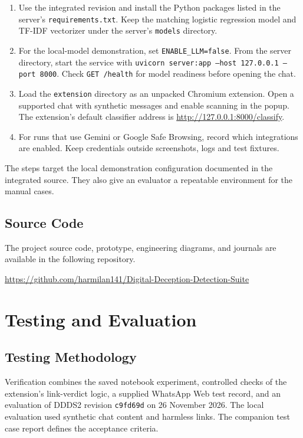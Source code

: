 \documentclass[12pt,letterpaper,twoside,openany]{book}
\newcommand{\DDDSRepo}{https://github.com/harmilan141/Digital-Deception-Detection-Suite}
\begin{document}
\begin{enumerate}
  \item Use the integrated revision and install the Python packages listed in the server's \texttt{requirements.txt}. Keep the matching logistic regression model and TF-IDF vectorizer under the server's \texttt{models} directory.
  \item For the local-model demonstration, set \texttt{ENABLE\_LLM=false}. From the server directory, start the service with \texttt{uvicorn server:app --host 127.0.0.1 --port 8000}. Check \texttt{GET /health} for model readiness before opening the chat.
  \item Load the \texttt{extension} directory as an unpacked Chromium extension. Open a supported chat with synthetic messages and enable scanning in the popup. The extension's default classifier address is \url{http://127.0.0.1:8000/classify}.
  \item For runs that use Gemini or Google Safe Browsing, record which integrations are enabled. Keep credentials outside screenshots, logs and test fixtures.
\end{enumerate}

The steps target the local demonstration configuration documented in the integrated source. They also give an evaluator a repeatable environment for the manual cases. \cite{integration}

\section{Source Code}

The project source code, prototype, engineering diagrams, and journals are available in the following repository.

\noindent\expandafter\url\expandafter{\DDDSRepo}

\chapter{Testing and Evaluation}
\label{chap:testing}

\section{Testing Methodology}

Verification combines the saved notebook experiment, controlled checks of the extension's link-verdict logic, a supplied WhatsApp Web test record, and an evaluation of DDDS2 revision \texttt{c9fd69d} on 26 November 2026. The local evaluation used synthetic chat content and harmless links. The companion test case report defines the acceptance criteria.
\end{document}
